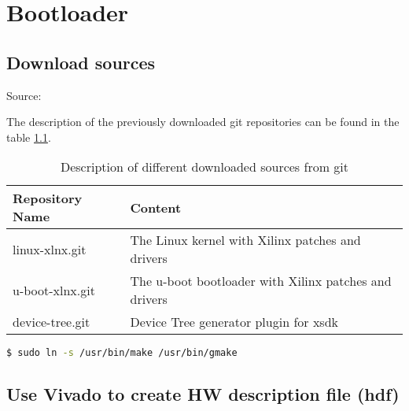 \chapter{Bootloader}

\section{Download sources}
Source:\\
\vspace{1em}

\vspace{1em}

The description of the previously downloaded git repositories can be found in the table \ref{tab:git}.

\begin{table}
\centering
\begin{tabular}{ll}
\toprule
\textbf{Repository Name} & \textbf{Content}\\
\midrule
linux-xlnx.git & The Linux kernel with Xilinx patches and drivers\\
u-boot-xlnx.git & The u-boot bootloader with Xilinx patches and drivers\\
device-tree.git & Device Tree generator plugin for xsdk\\
\bottomrule
\end{tabular}
\caption{Description of different downloaded sources from git}
\label{tab:git}
\end{table}

\begin{lstlisting}[language=bash]
$ sudo ln -s /usr/bin/make /usr/bin/gmake
\end{lstlisting}

\section{Use Vivado to create HW description file (hdf)}


